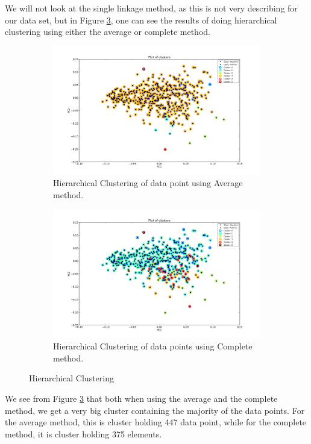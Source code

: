We will not look at the single linkage method, as this is not very describing for our data set, but in Figure \ref{HCResults}, one can see the results of doing hierarchical clustering using either the average or complete method.

\begin{figure}[h]
\begin{subfigure}[b]{1\textwidth}
\includegraphics[scale=0.5]{pictures/HCAvg.png}
\caption{Hierarchical Clustering of data point using Average method.}
\label{HCResultsAVG}
\end{subfigure}
\begin{subfigure}[b]{1\textwidth}
\includegraphics[scale=0.5]{pictures/HCCom.png}
\caption{Hierarchical Clustering of data points using Complete method.}
\label{HCResultsCOM}
\end{subfigure}
\caption{Hierarchical Clustering}
\label{HCResults}
\end{figure}

We see from Figure \ref{HCResults} that both when using the average and the complete method, we get a very big cluster containing the majority of the data points. For the average method, this is cluster \HCAVGD{} holding 447 data point, while for the complete method, it is cluster \HCCOMD{}  holding 375 elements.

